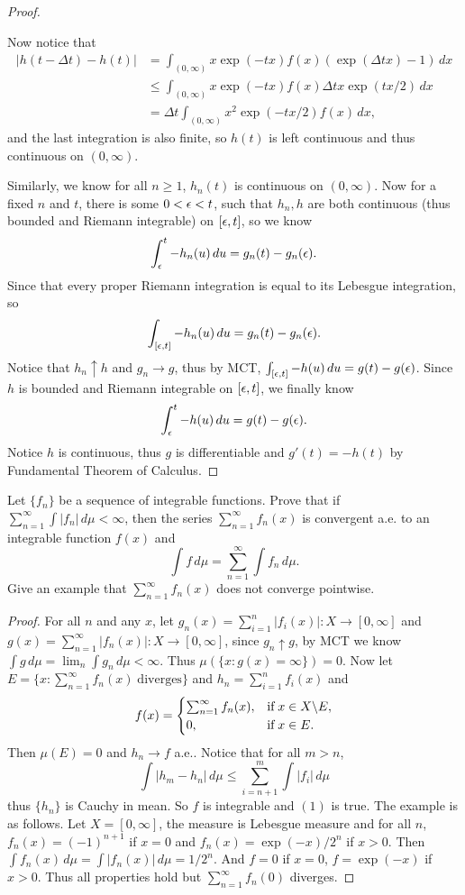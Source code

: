 \begin{proof}
\begin{description}
	Now notice that
	\begin{align*}
	|h(t-\Delta t)-h(t)|&=\int_{(0,\infty)} x\exp(-tx)f(x)(\exp(\Delta tx)-1)\,dx\\
	&\leq \int_{(0,\infty)} x\exp(-tx)f(x)\Delta tx\exp(tx/2)\,dx\\
	&=\Delta t\int_{(0,\infty)} x^2\exp(-tx/2)f(x)\,dx,
	\end{align*}
	and the last integration is also finite, so $h(t)$ is left continuous and thus continuous on $(0,\infty)$.
	\end{description}
	Similarly, we know for all $n\geq 1$, $h_n(t)$ is continuous on $(0,\infty)$. Now for a fixed $n$ and $t$, there is some $0<\epsilon<t$, such that $h_n,h$ are both continuous (thus bounded and Riemann integrable) on $[\epsilon,t]$, so we know
	\[\int_{\epsilon}^t -h_n(u)\,du=g_n(t)-g_n(\epsilon).\]
	Since that every proper Riemann integration is equal to its Lebesgue integration, so
	\[\int_{[\epsilon,t]} -h_n(u)\,du=g_n(t)-g_n(\epsilon).\]
	Notice that $h_n\uparrow h$ and $g_n\to g$, thus by MCT, $\int_{[\epsilon,t]} -h(u)\,du=g(t)-g(\epsilon)$. Since $h$ is bounded and Riemann integrable on $[\epsilon,t]$, we finally know
	\[\int_{\epsilon}^t -h(u)\,du=g(t)-g(\epsilon).\]
	Notice $h$ is continuous, thus $g$ is differentiable and $g'(t)=-h(t)$ by Fundamental Theorem of Calculus.
\end{proof}

\begin{pro}%
	Let $\{f_n\}$ be a sequence of integrable functions. Prove that if $\sum_{n=1}^\infty \int |f_n|\,d\mu<\infty$, then the series $\sum_{n=1}^\infty f_n(x)$ is convergent a.e. to an integrable function $f(x)$ and
	\[\int f\,d\mu=\sum_{n=1}^\infty \int f_n\,d\mu.\tag{1}\]
	Give an example that $\sum_{n=1}^{\infty} f_n(x)$ does not converge pointwise.
\end{pro}
\begin{proof}
	For all $n$ and any $x$, let $g_n(x)=\sum_{i=1}^n |f_i(x)|\colon X\to[0,\infty]$ and $g(x)=\sum_{n=1}^{\infty} |f_n(x)|\colon X\to [0,\infty]$, since $g_n\uparrow g$, by MCT we know $\int g\,d\mu=\lim_n \int g_n\,d\mu<\infty$. Thus $\mu(\{x\colon g(x)=\infty\})=0$. Now let $E=\{x\colon \sum_{n=1}^{\infty} f_n(x)\;\mbox{diverges}\}$ and $h_n=\sum_{i=1}^n f_i(x)$ and
	\[f(x)=\begin{cases}
	\sum_{n=1}^{\infty} f_n(x),&\mbox{if}\;x\in X\backslash E,\\
	0,&\mbox{if}\; x\in E.\end{cases}\]
	Then $\mu(E)=0$ and $h_n\to f$ a.e.. Notice that for all $m>n$,
	\[\int |h_m-h_n|\,d\mu\leq \sum_{i=n+1}^m \int |f_i|\,d\mu\]
	thus $\{h_n\}$ is Cauchy in mean. So $f$ is integrable and $(1)$ is true. The example is as follows. Let $X=[0,\infty]$, the measure is Lebesgue measure and for all $n$, $f_n(x)=(-1)^{n+1}$ if $x=0$ and $f_n(x)=\exp(-x)/2^n$ if $x>0$. Then $\int f_n(x)\,d\mu=\int |f_n(x)|\,d\mu=1/2^n$. And $f=0$ if $x=0$, $f=\exp(-x)$ if $x>0$. Thus all properties hold but $\sum_{n=1}^\infty f_n(0)$ diverges.
\end{proof}

